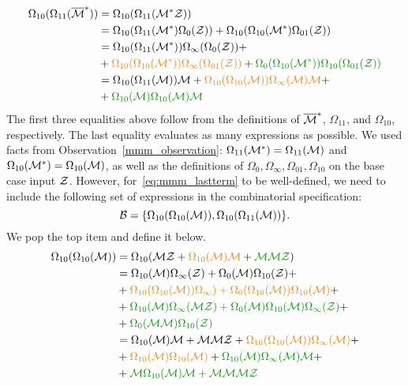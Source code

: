 \documentclass[12pt, a4paper, twoside]{report}
\begin{document}
\begin{align}
  \begin{aligned}
\Omega_{10}(\Omega_{11}(\barMstar)) &= \Omega_{10}(\Omega_{11}(\Mstar\Z))\quad\\
                                    &= \Omega_{10}(\Omega_{11}(\Mstar)\Omega_0(\Z)) + \Omega_{10}(\Omega_{10}(\Mstar)\Omega_{01}(\Z)) \\
                                    &= \Omega_{10}(\Omega_{11}(\Mstar))\Omega_\infty(\Omega_0(\Z)) +\\
                                    &+ \textcolor{orange}{\Omega_{10}(\Omega_{10}(\Mstar))\Omega_\infty(\Omega_{01}(\Z))} + \textcolor{green}{\Omega_0(\Omega_{10}(\Mstar))\Omega_{10}(\Omega_{01}(\Z))}\\
                                    &= \Omega_{10}(\Omega_{11}(\M))\M + \textcolor{orange}{\Omega_{10}(\Omega_{10}(\M))\Omega_\infty(\M)\M} +\\
                                    &+ \textcolor{green}{\Omega_{10}(\M)\Omega_{10}(\M)\M} \\
  \end{aligned}
\label{eq:mmm_lastterm}
\end{align}
The first three equalities above follow from the definitions of $\overline{\mathcal{M}}^*$, $\Omega_{11}$, and $\Omega_{10}$, respectively. The last equality evaluates as many expressions as possible. We used facts from Observation~\ref{mmm_observation}: $\Omega_{11}(\mathcal{M}^*) = \Omega_{11}(\mathcal{M})$ and $\Omega_{10}(\mathcal{M}^*)=\Omega_{10}(\mathcal{M})$, as well as the definitions of $\Omega_0, \Omega_\infty, \Omega_{01}, \Omega_{10}$ on the base case input $\mathcal{Z}$. However, for~\eqref{eq:mmm_lastterm} to be well-defined, we need to include the following set of expressions in the combinatorial specification: $$\mathcal{B} = \{\Omega_{10}(\Omega_{10}(\mathcal{M})), \Omega_{10}(\Omega_{11}(\mathcal{M}))\}.$$
We pop the top item and define it below.
\begin{align}
  \begin{aligned}
    \Omega_{10}(\Omega_{10}(\M)) &= \Omega_{10}(\M\Z + \textcolor{orange}{\Omega_{10}(\M)\M} + \textcolor{green}{\M\M\Z})\\
    &= \Omega_{10}(\M)\Omega_\infty(\Z) + \Omega_0(\M)\Omega_{10}(\Z) +\\
    &+ \textcolor{orange}{\Omega_{10}(\Omega_{10}(\M))\Omega_\infty) + \Omega_0(\Omega_{10}(\M))\Omega_{10}(\M)} +\\
    &+ \textcolor{green}{\Omega_{10}(\M)\Omega_\infty(\M\Z) + \Omega_0(\M)\Omega_{10}(\M)\Omega_\infty(\Z)} +\\
    &+ \textcolor{green}{\Omega_0(\M\M)\Omega_{10}(\Z)}\\
    &= \Omega_{10}(\M)\M + \M\M\Z + \textcolor{orange}{\Omega_{10}(\Omega_{10}(\M))\Omega_\infty(\M)} +\\
    &+ \textcolor{orange}{\Omega_{10}(\M)\Omega_{10}(\M)} + \textcolor{green}{\Omega_{10}(\M)\Omega_\infty(\M)\M} +\\
    &+ \textcolor{green}{\M\Omega_{10}(\M)\M + \M\M\M\Z}
  \end{aligned}
      \label{eq:mmm_omega1010M}
\end{align}
\end{document}
